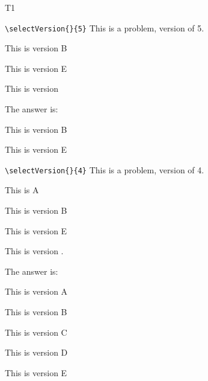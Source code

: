 \documentclass{article}
\begin{document}
\begin{exam}{T1}
\begin{problem*}[2ea]
\begin{parts}
    \item \verb!\selectVersion{}{5}! This is a problem, version  of 5.

\begin{verB}
This is version B
\end{verB}
\begin{verE}
This is version E
\end{verE}

\begin{solution}
This is version 

The answer is:
\begin{verB}
This is version B
\end{verB}
\begin{verE}
This is version E
\end{verE}
\end{solution}

    \item \verb!\selectVersion{}{4}! This is a problem, version  of 4.
\begin{verA}
This is A
\end{verA}
\begin{verB}
This is version B
\end{verB}
\begin{verE}
This is version E
\end{verE}
\begin{solution}
This is version .

The answer is:
\begin{verA}
This is version A
\end{verA}
\begin{verB}
This is version B
\end{verB}
\begin{verC}
This is version C
\end{verC}
\begin{verD}
This is version D
\end{verD}
\begin{verE}
This is version E
\end{verE}
\end{solution}

\end{parts}
\end{problem*}


\end{exam}
\end{document}
